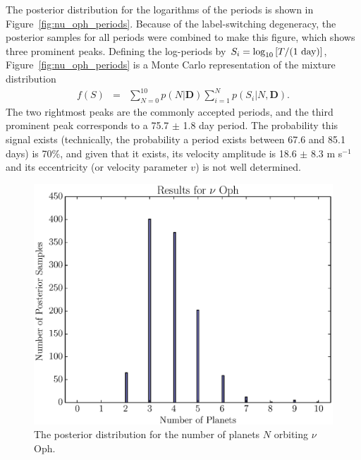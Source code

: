 \documentclass[useAMS,usenatbib]{mn2e}
\newcommand{\bdata}{\boldsymbol{D}}
\begin{document}
The posterior distribution for the logarithms of the periods is shown in
Figure~\ref{fig:nu_oph_periods}. Because of the label-switching degeneracy,
the posterior samples for all periods were combined to make this figure, which
shows three prominent peaks. Defining the log-periods by
$S_i =  \log_{10}\left[T/(\textnormal{1 day})\right]$,
Figure~\ref{fig:nu_oph_periods} is a Monte Carlo representation
of the mixture distribution
\begin{eqnarray}
f(S) &=& \sum_{N=0}^{10} p(N | \bdata)\sum_{i=1}^N p(S_i | N, \bdata).
\end{eqnarray}
The two rightmost peaks are the commonly accepted periods, and the third
prominent peak corresponds to a 75.7 $\pm$ 1.8 day period. The probability
this signal exists (technically, the probability a period exists between
67.6 and 85.1 days)
is 70\%, and given that it exists, its velocity amplitude
is 18.6 $\pm$ 8.3 m s$^{-1}$ and its eccentricity (or velocity parameter $v$)
is not well determined.

\begin{figure}
\includegraphics[scale=0.45]{Figures/nu_oph_N.eps}
\caption{The posterior distribution for the number of planets $N$ orbiting
$\nu$ Oph.\label{fig:nu_oph_N}}
\end{figure}
\end{document}

